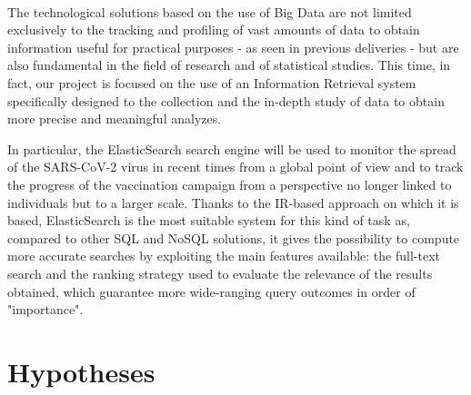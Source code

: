 \documentclass[a4paper,12pt]{article}
\begin{document}
\paragraph{}The technological solutions based on the use of Big Data are not limited exclusively to the tracking and profiling of vast amounts of data to obtain information useful for practical purposes - as seen in previous deliveries - but are also fundamental in the field of research and of statistical studies. This time, in fact, our project is focused on the use of an Information Retrieval system specifically designed to the collection and the in-depth study of data to obtain more precise and meaningful analyzes. \par
In particular, the ElasticSearch search engine will be used to monitor the spread of the SARS-CoV-2 virus in recent times from a global point of view and to track the progress of the vaccination campaign from a perspective no longer linked to individuals but to a larger scale. Thanks to the IR-based approach on which it is based, ElasticSearch is the most suitable system for this kind of task as, compared to other SQL and NoSQL solutions, it gives the possibility to compute more accurate searches by exploiting the main features available: the full-text search and the ranking strategy used to evaluate the relevance of the results obtained, which guarantee more wide-ranging query outcomes in order of "importance".
\section{Hypotheses}
\end{document}
